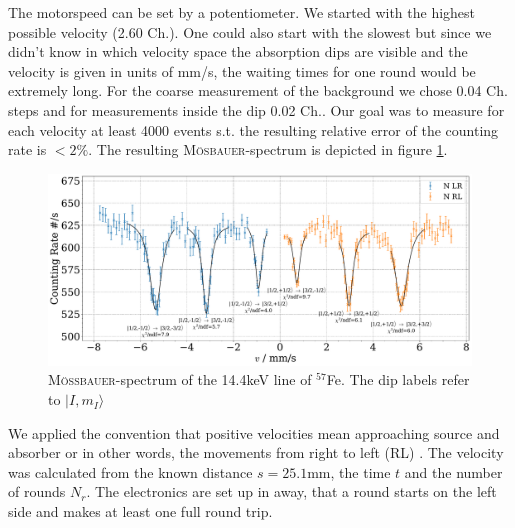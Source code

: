 \documentclass[11pt,a4paper,notitlepage]{scrartcl}
\begin{document}
The motorspeed can be set by a potentiometer. We started with the highest possible velocity (2.60 Ch.). One could also start with the slowest but since we didn't know in which velocity space the absorption dips are visible and the velocity is given in units of mm/s, the waiting times for one round would be extremely long. For the coarse measurement of the background we chose 0.04 Ch. steps and for measurements inside the dip 0.02 Ch.. Our goal was to measure for each velocity at least 4000 events s.t. the resulting relative error of the counting rate is $<2\%$. The resulting \textsc{Mösbauer}-spectrum is depicted in figure \ref{fig:moesbauer}.

\begin{figure}[H]
	\includegraphics[width=\linewidth]{figs/moesbauer.pdf}
	\caption{ \textsc{Mö\ss bauer}-spectrum of the 14.4keV line of $^{57}$Fe. The dip labels refer to $|I,m_I \rangle$}\label{fig:moesbauer}
\end{figure}

We applied the convention that positive velocities mean approaching source and absorber or in other words, the movements from right to left (RL) \cite{chemistry}. The velocity was calculated from the known distance $s=25.1$mm, the time $t$ and the number of rounds $N_r$. The electronics are set up in away, that a round starts on the left side and makes at least one full round trip. 
\end{document}
